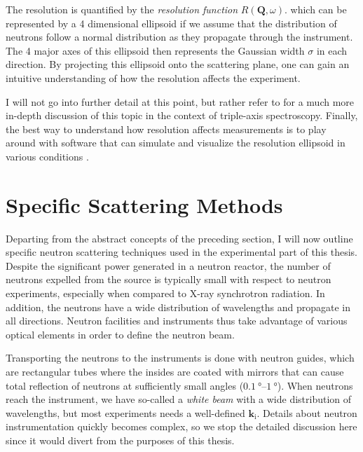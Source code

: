 The resolution is quantified by the \emph{resolution function} $R(\bm{Q}, \omega)$. which can be represented by a 4 dimensional ellipsoid if we assume that the distribution of neutrons follow a normal distribution as they propagate through the instrument. The 4 major axes of this ellipsoid then represents the Gaussian width $\sigma$ in each direction. By projecting this ellipsoid onto the scattering plane, one can gain an intuitive understanding of how the resolution affects the experiment.

I will not go into further detail at this point, but rather refer to \cite[Chapter 4]{Shirane2002} for a much more in-depth discussion of this topic in the context of triple-axis spectroscopy. Finally, the best way to understand how resolution affects measurements is to play around with software that can simulate and visualize the resolution ellipsoid in various conditions \cite{Weber2016, Saroun1997}.


\section{Specific Scattering Methods}\label{sec:specific_neutron}
Departing from the abstract concepts of the preceding section, I will now outline specific neutron scattering techniques used in the experimental part of this thesis. Despite the significant power generated in a neutron reactor, the number of neutrons expelled from the source is typically small with respect to neutron experiments, especially when compared to X-ray synchrotron radiation. In addition, the neutrons have a wide distribution of wavelengths and propagate in all directions. Neutron facilities and instruments thus take advantage of various optical elements in order to define the neutron beam.

Transporting the neutrons to the instruments is done with neutron guides, which are rectangular tubes where the insides are coated with mirrors that can cause total reflection of neutrons at sufficiently small angles ($\SIrange{0.1}{1}{\degree}$). When neutrons reach the instrument, we have so-called a \emph{white beam} with a wide distribution of wavelengths, but most experiments needs a well-defined $\bm{k}_\text{i}$. Details about neutron instrumentation quickly becomes complex, so we stop the detailed discussion here since it would divert from the purposes of this thesis.



